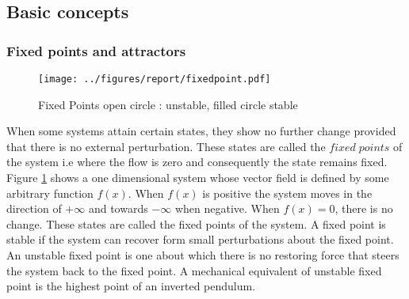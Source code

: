 \subsection{Basic concepts}
\subsubsection{Fixed points and attractors}
\begin{figure}
\centering
\texttt{[image: ../figures/report/fixedpoint.pdf]}
\caption[Fixed points]{Fixed Points open circle : unstable, filled circle stable}
\label{fixedpt}
\end{figure}
When some systems attain certain states, they show no further change provided that there is no external perturbation. These states are called the $fixed \; points$ of the system i.e where the flow is zero and consequently the state remains fixed.  Figure \ref{fixedpt} shows a one dimensional system whose vector field is defined by some arbitrary function $f(x)$. When $f(x)$ is positive the system moves in the direction of $+ \infty$ and towards $- \infty $ when negative. When $f(x) = 0$, there is no change. These states are called the fixed points of the system. A fixed point is stable if the system can recover form small perturbations about the fixed point. An unstable fixed point is one about which there is no restoring force that steers the system back to the fixed point.  A mechanical equivalent of unstable fixed point is the highest point of an inverted pendulum.


